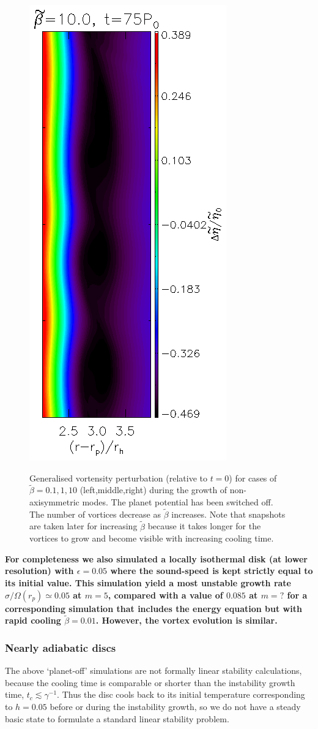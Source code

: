 \begin{figure}
{    \includegraphics[width=0.3\linewidth]{figures/analysis_gvortensity75}
  }  
  \caption{Generalised vortensity perturbation (relative to $t=0$) for
    cases of $\tilde{\beta}=0.1,1,10$ (left,middle,right) during
    the growth of non-axisymmetric modes. The planet potential has
    been switched off.  The number of vortices
    decrease as $\tilde{\beta}$ increases. Note that snapshots are
    taken later for increasing $\tilde{\beta}$ because it takes longer
    for the vortices to grow and become visible with increasing cooling time. 
    \label{2Dlinear} 
  } 
\end{figure}

{\bf For completeness we also simulated a locally
  isothermal disk (at lower resolution) with $\epsilon=0.05$ where the
  sound-speed is kept strictly equal to its initial value.  This
  simulation yield a most unstable growth rate
  $\sigma/\Omega(r_p)\simeq 0.05$ at $m=5$,   
  compared with a value of $0.085$ at $m=?$ for a corresponding
  simulation that includes the energy equation but with rapid cooling
  $\tilde{\beta}=0.01$. However, the vortex evolution is similar.}   

\subsubsection{Nearly adiabatic discs}
\label{adiabatic_section}

The above `planet-off' simulations are not formally linear
stability calculations, because the cooling time is comparable or shorter
than the instability growth time, $t_c\lesssim\gamma^{-1}$.  
Thus the disc cools back to its initial temperature corresponding to
$h=0.05$ before or during the instability growth, so we do not 
have a steady basic state to formulate a standard linear stability 
problem. 

